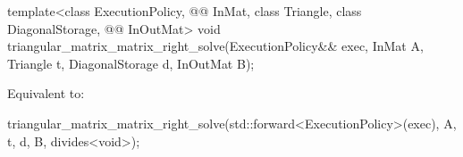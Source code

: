 %
\begin{itemdecl}
template<class ExecutionPolicy,
         @@ InMat, class Triangle, class DiagonalStorage, @@ InOutMat>
  void triangular_matrix_matrix_right_solve(ExecutionPolicy&& exec,
                                            InMat A, Triangle t, DiagonalStorage d,
                                            InOutMat B);
\end{itemdecl}

\begin{itemdescr}
\pnum
\effects
Equivalent to:
\begin{codeblock}
triangular_matrix_matrix_right_solve(std::forward<ExecutionPolicy>(exec),
                                     A, t, d, B, divides<void>{});
\end{codeblock}
\end{itemdescr}
